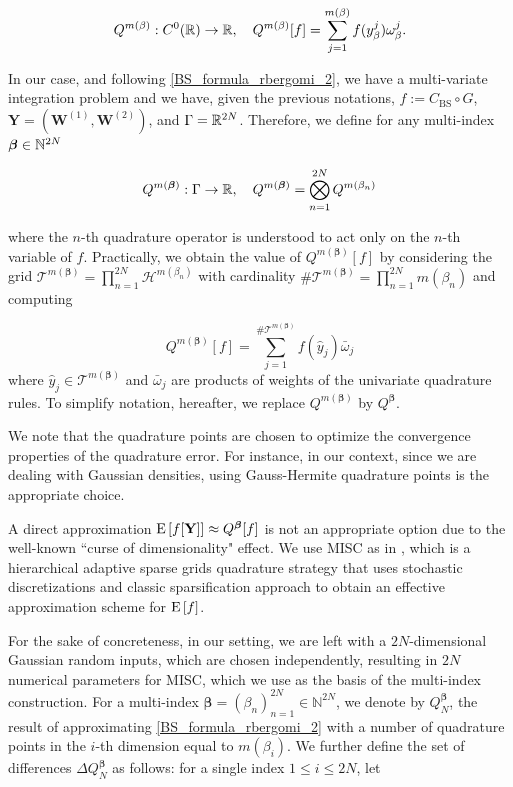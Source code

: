 \begin{equation}
Q^{m(\beta)}:C^0(\mathbb{R}) \rightarrow \mathbb{R}, \quad Q^{m(\beta)}[f]= \sum_{j=1}^{m(\beta)} f(y^j_\beta) \omega_\beta^j.
\end{equation}





In our case, and following \eqref{BS_formula_rbergomi_2}, we have a multi-variate integration problem and  we have, given the previous notations,    $f:=C_{\text{BS}}\circ G$, $\mathbf{Y}=(\mathbf{W}^{(1)},\mathbf{W}^{(2)})$, and  $\Gamma=\mathbb{R}^{2N}$.  Therefore,  we define for any multi-index $\boldsymbol{\beta} \in \mathbb{N}^{2N}$

$$Q^{m(\boldsymbol{\beta})}: \Gamma \rightarrow \mathbb{R},\quad  Q^{m(\boldsymbol{\beta})}= \bigotimes_{n = 1}^{2N} Q^{m(\beta_n)} $$

where the $n$-th quadrature operator is understood to act only on the $n$-th variable of $f$. Practically, we obtain the value of $Q^{m(\boldsymbol{\beta})}[f]$  by considering the grid $\mathcal{T}^{m(\boldsymbol{\beta})}= \prod_{n = 1}^{2N}  \mathcal{H}^{m(\beta_n)}$ with cardinality $\#\mathcal{T}^{m(\boldsymbol{\beta})}=\prod_{n=1}^{2N} m (\beta_n)$ and computing

$$ Q^{m(\boldsymbol{\beta})}[f]= \sum_{j=1}^{\#\mathcal{T}^{m(\boldsymbol{\beta})}} f(\hat{y}_j) \bar{\omega}_j$$
where $\hat{y}_j \in \mathcal{T}^{m(\boldsymbol{\beta})}$ and $\bar{\omega}_j$ are  products of weights of the univariate quadrature rules. To simplify notation, hereafter, we replace  $Q^{m(\boldsymbol{\beta})}$ by $Q^{\boldsymbol{\beta}}$.

\begin{remark}
We note that the quadrature points are chosen to optimize the convergence properties of the quadrature error.  For instance, in our context, since we are dealing with Gaussian densities, using Gauss-Hermite quadrature points is the appropriate choice.
\end{remark}

A direct approximation $\mathrm{E}\left[f[\mathbf{Y}]\right] \approx Q^{\boldsymbol{\beta}}[f]$ is not an appropriate option  due to the well-known ``curse of dimensionality" effect. We use MISC as in \cite{haji2016multi}, which is a hierarchical adaptive sparse grids quadrature strategy that uses  stochastic discretizations  and classic sparsification approach to obtain an effective approximation scheme for $\mathrm{E}\left[f\right]$. 

 For the sake
of concreteness, in our setting, we are left with a $2N$-dimensional Gaussian random inputs, which are chosen independently, resulting in  $2N$ numerical parameters for MISC, which we use as the basis of the multi-index construction. For a multi-index $\boldsymbol{\beta} = (\beta_n)_{n=1}^{2N} \in \mathbb{N}^{2N}$, we denote  by
$Q_N^{\boldsymbol{\beta}}$,   the result of approximating \eqref{BS_formula_rbergomi_2} with a number of quadrature points  in the $i$-th dimension equal to  $m(\beta_i)$. We further define the set of
differences $\Delta Q_N^{\boldsymbol{\beta}}$ as follows: for a single index $1 \le i \le 2N$,
let




